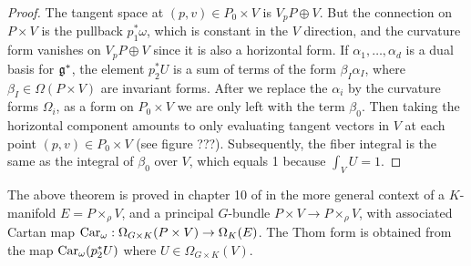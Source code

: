 \begin{proof}
	The tangent space at $(p,v)\in P_0\times V$ 
	is $V_pP \oplus V$. But the connection on $P\times V$ is the pullback 
	$p_1^*\omega$, which is constant in the $V$ direction, and the curvature
	form vanishes on  $V_pP\oplus V$ since it is also a horizontal form. 
	If $\alpha_1,\ldots,\alpha_d$ is a dual basis for
	$\operatorname{\mathfrak{g}}^*$, the element $p_2^*U$ is a sum of terms of the form 
	$\beta_I \alpha_I$, where  $\beta_I \in \Omega(P\times V)$ are invariant
	forms. 
	After we replace the $\alpha_i$ by the curvature forms  $\Omega_i$, as a
	form on $P_0\times V$ we are only left with the term $\beta_0$. 
	Then taking the horizontal component amounts to only evaluating tangent
	vectors in $V$ at each point $(p,v)\in P_0\times V$ (see figure ???). 
	Subsequently, the fiber integral is the same as the integral of 
	$\beta_0$ over $V$, which equals 1 because $\int_V U = 1$.  
	\begin{comment} %
	This is defined on $\Omega(P\times_G V)\simeq \Omega(E)$ in exactly the same
	way, since coordinate functions on $E$ can be pulled back via the canonical
	isomorphism to coordinate functions on $P\times_G V$. 
	Recall that a local trivialisation 
	$\phi_\alpha : E|_{U_\alpha} \to U_\alpha \times
	\mathbb{R}^n$ gives coordinate functions $[t_1\cdots t_n] = p_2\phi_\alpha
	\in \mathbb{R}^n$ where $p_2$ is the projection on to $\mathbb{R}^n$.  
	This can be identified with coordinate functions on the associated bundle
	$[x_1\cdots]$
	\end{comment}
\end{proof}

The above theorem is proved in chapter 10 of \cite{guillemin} in the more
general context of a $K$-manifold $E=P\times_\rho V$, and a principal
$G$-bundle  $P\times V \to P\times_\rho V$, with associated Cartan map
$\operatorname{Car}_\omega : \Omega_{G\times K}(P\times V)\to\Omega_K(E)$. The Thom form is
obtained from the map $\operatorname{Car}_{\omega}(p_2^*U)$ where $U\in\Omega_{G\times K}(V)$.


